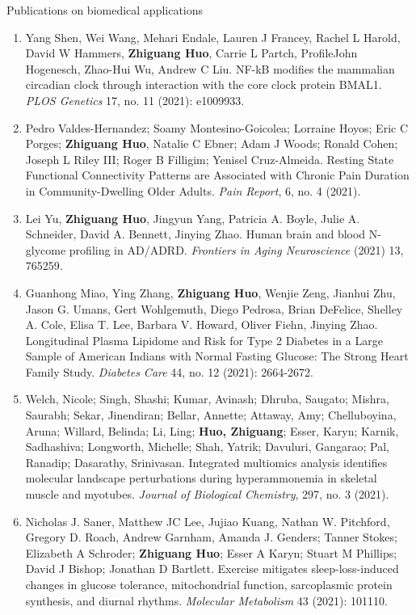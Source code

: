\documentclass{resume} %
\begin{document}
\begin{rSection}{Publications on biomedical applications}
\begin{enumerate}[noitemsep,topsep=0pt, resume]
\item  
Yang Shen, Wei Wang, Mehari Endale, Lauren J Francey, Rachel L Harold, David W Hammers, {\bf Zhiguang Huo}, Carrie L Partch, ProfileJohn Hogenesch, Zhao-Hui Wu, Andrew C Liu.
NF-kB modifies the mammalian circadian clock through interaction with the core clock protein BMAL1.
\emph{PLOS Genetics} 17, no. 11 (2021): e1009933.


\item 
 Pedro Valdes-Hernandez; Soamy Montesino-Goicolea; Lorraine Hoyos; Eric C Porges; {\bf Zhiguang Huo}, Natalie C Ebner; Adam J Woods; Ronald Cohen; Joseph L Riley III; Roger B Filligim; Yenisel Cruz-Almeida. 
 Resting State Functional Connectivity Patterns are Associated with Chronic Pain Duration in Community-Dwelling Older Adults. 
\emph{Pain Report},  6, no. 4 (2021).


\item
Lei Yu, {\bf Zhiguang Huo}, Jingyun Yang, Patricia A. Boyle, Julie A. Schneider, David A. Bennett, Jinying Zhao.
Human brain and blood N-glycome profiling in AD/ADRD.
\emph{Frontiers in Aging Neuroscience} (2021) 13, 765259. 

\item
Guanhong Miao, Ying Zhang, {\bf Zhiguang Huo}, Wenjie Zeng, Jianhui Zhu, Jason G. Umans, Gert Wohlgemuth, Diego Pedrosa, Brian DeFelice, Shelley A. Cole, Elisa T. Lee, Barbara V. Howard, Oliver Fiehn, Jinying Zhao.
Longitudinal Plasma Lipidome and Risk for Type 2 Diabetes in a Large Sample of American Indians with Normal Fasting Glucose: The Strong Heart Family Study. 
\emph{Diabetes Care}  44, no. 12 (2021): 2664-2672.


\item
Welch, Nicole; Singh, Shashi; Kumar, Avinash; Dhruba, Saugato; Mishra, Saurabh; Sekar, Jinendiran; Bellar, Annette; Attaway, Amy; Chelluboyina, Aruna; Willard, Belinda; Li, Ling; {\bf Huo, Zhiguang}; Esser, Karyn; Karnik, Sadhashiva; Longworth, Michelle; Shah, Yatrik; Davuluri, Gangarao; Pal, Ranadip; Dasarathy, Srinivasan.
Integrated multiomics analysis identifies molecular landscape perturbations during hyperammonemia in skeletal muscle and myotubes. 
\emph{Journal of Biological Chemistry}, 297, no. 3 (2021).


\item  
Nicholas J. Saner, Matthew JC Lee, Jujiao Kuang, Nathan W. Pitchford, Gregory D. Roach, Andrew Garnham, Amanda J. Genders; Tanner Stokes; Elizabeth A Schroder; {\bf Zhiguang Huo}; Esser A Karyn; Stuart M Phillips; David J Bishop; Jonathan D Bartlett.
Exercise mitigates sleep-loss-induced changes in glucose tolerance, mitochondrial function, sarcoplasmic protein synthesis, and diurnal rhythms.
\emph{Molecular Metabolism} 43 (2021): 101110.


\end{enumerate}
\end{rSection}
\end{document}
